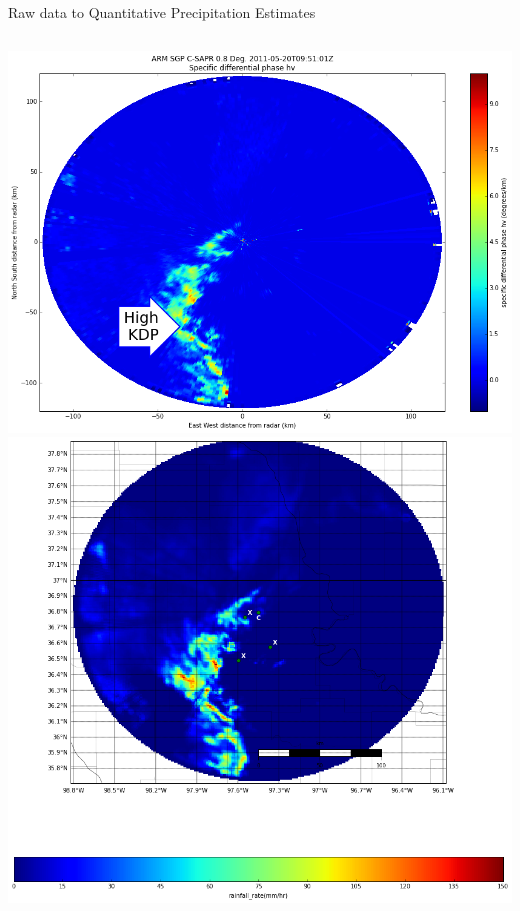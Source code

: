 \documentclass[final]{beamer}
\begin{document}
\begin{frame}{}
\begin{columns}[t]
\begin{column}{.3\linewidth}
\begin{block}{Raw data to Quantitative Precipitation Estimates}
\begin{columns}[t]
\begin{column}{.62\linewidth}
\begin{columns}[t]
\begin{column}{.5\linewidth}
           		\includegraphics[width=.95\linewidth]{figures/kdp.png}\\[1ex]    %
			\includegraphics[width=.95\linewidth]{figures/qpe.png}\\[1ex]  
		

\end{column}
\end{columns}
\end{column}
\end{columns}
\end{block}
\end{column}
\end{columns}
\end{frame}
\end{document}
